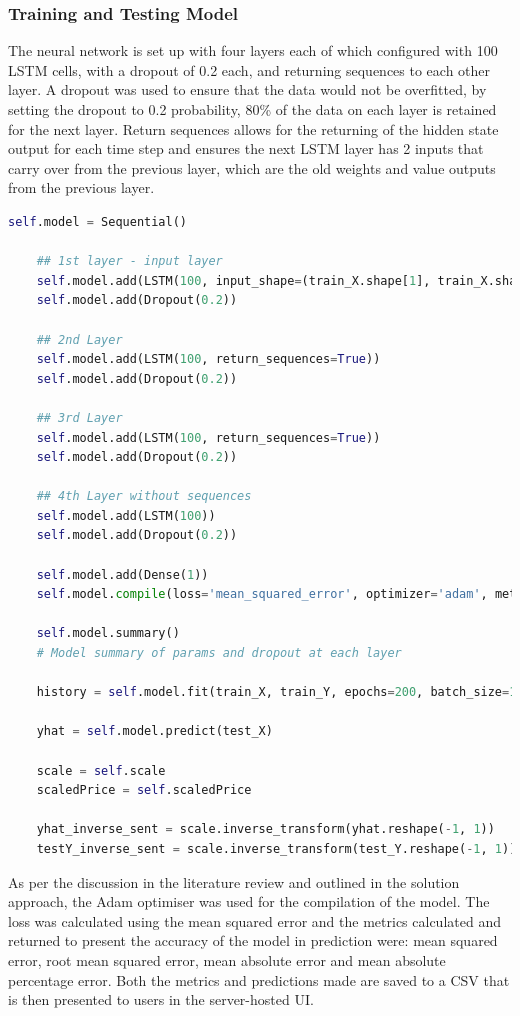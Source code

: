 \documentclass[oneside, 12pt]{article}
\begin{document}
		\subsubsection{Training and Testing Model}
		
		The neural network is set up with four layers each of which configured with 100 LSTM cells, with a dropout of 0.2 each, and returning sequences to each other layer. A dropout was used to ensure that the data would not be overfitted, by setting the dropout to 0.2 probability, 80\% of the data on each layer is retained for the next layer. Return sequences allows for the returning of the hidden state output for each time step and ensures the next LSTM layer has 2 inputs that carry over from the previous layer, which are the old weights and value outputs from the previous layer.
			
		\begin{lstlisting}[language=python, caption=LSTM model creation\, layering\, compiling and fitting]
	self.model = Sequential()
	
	## 1st layer - input layer
	self.model.add(LSTM(100, input_shape=(train_X.shape[1], train_X.shape[2]), return_sequences=True))
	self.model.add(Dropout(0.2))
	
	## 2nd Layer
	self.model.add(LSTM(100, return_sequences=True))
	self.model.add(Dropout(0.2))
	
	## 3rd Layer
	self.model.add(LSTM(100, return_sequences=True))
	self.model.add(Dropout(0.2))
	
	## 4th Layer without sequences
	self.model.add(LSTM(100))
	self.model.add(Dropout(0.2))
	
	self.model.add(Dense(1))
	self.model.compile(loss='mean_squared_error', optimizer='adam', metrics=['mse', 'mae', 'mape'])
	
	self.model.summary()
	# Model summary of params and dropout at each layer
	
	history = self.model.fit(train_X, train_Y, epochs=200, batch_size=1000, validation_data=(test_X, test_Y), verbose=0, shuffle=False, callbacks=[TQDMCallback()])
	
	yhat = self.model.predict(test_X)
	
	scale = self.scale
	scaledPrice = self.scaledPrice
	
	yhat_inverse_sent = scale.inverse_transform(yhat.reshape(-1, 1))
	testY_inverse_sent = scale.inverse_transform(test_Y.reshape(-1, 1))
		\end{lstlisting}	
		
		As per the discussion in the literature review and outlined in the solution approach, the Adam optimiser was used for the compilation of the model. The loss was calculated using the mean squared error and the metrics calculated and returned to present the accuracy of the model in prediction were: mean squared error, root mean squared error, mean absolute error and mean absolute percentage error. Both the metrics and predictions made are saved to a CSV that is then presented to users in the server-hosted UI.
		
\end{document}
